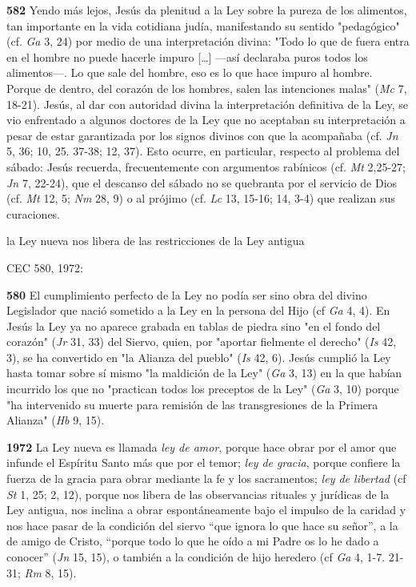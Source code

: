 \documentclass[]{article}
\begin{document}
\textbf{582} Yendo más lejos, Jesús da plenitud a la Ley sobre la pureza
de los alimentos, tan importante en la vida cotidiana judía,
manifestando su sentido "pedagógico" (cf. \emph{Ga} 3, 24) por medio de
una interpretación divina: "Todo lo que de fuera entra en el hombre no
puede hacerle impuro [\ldots{}] ---así declaraba puros todos los
alimentos---. Lo que sale del hombre, eso es lo que hace impuro al
hombre. Porque de dentro, del corazón de los hombres, salen las
intenciones malas" (\emph{Mc} 7, 18-21). Jesús, al dar con autoridad
divina la interpretación definitiva de la Ley, se vio enfrentado a
algunos doctores de la Ley que no aceptaban su interpretación a pesar de
estar garantizada por los signos divinos con que la acompañaba (cf.
\emph{Jn} 5, 36; 10, 25. 37-38; 12, 37). Esto ocurre, en particular,
respecto al problema del sábado: Jesús recuerda, frecuentemente con
argumentos rabínicos (cf. \emph{Mt} 2,25-27; \emph{Jn} 7, 22-24), que el
descanso del sábado no se quebranta por el servicio de Dios (cf.
\emph{Mt} 12, 5; \emph{Nm} 28, 9) o al prójimo (cf. \emph{Lc} 13, 15-16;
14, 3-4) que realizan sus curaciones.

la Ley nueva nos libera de las restricciones de la Ley antigua

CEC 580, 1972:

\textbf{580} El cumplimiento perfecto de la Ley no podía ser sino obra
del divino Legislador que nació sometido a la Ley en la persona del Hijo
(cf \emph{Ga} 4, 4). En Jesús la Ley ya no aparece grabada en tablas de
piedra sino "en el fondo del corazón" (\emph{Jr} 31, 33) del Siervo,
quien, por "aportar fielmente el derecho" (\emph{Is} 42, 3), se ha
convertido en "la Alianza del pueblo" (\emph{Is} 42, 6). Jesús cumplió
la Ley hasta tomar sobre sí mismo "la maldición de la Ley" (\emph{Ga} 3,
13) en la que habían incurrido los que no "practican todos los preceptos
de la Ley" (\emph{Ga} 3, 10) porque "ha intervenido su muerte para
remisión de las transgresiones de la Primera Alianza" (\emph{Hb} 9, 15).

\textbf{1972} La Ley nueva es llamada \emph{ley de amor}, porque hace
obrar por el amor que infunde el Espíritu Santo más que por el temor;
\emph{ley de gracia}, porque confiere la fuerza de la gracia para obrar
mediante la fe y los sacramentos; \emph{ley de libertad} (cf \emph{St}
1, 25; 2, 12), porque nos libera de las observancias rituales y
jurídicas de la Ley antigua, nos inclina a obrar espontáneamente bajo el
impulso de la caridad y nos hace pasar de la condición del siervo ``que
ignora lo que hace su señor'', a la de amigo de Cristo, ``porque todo lo
que he oído a mi Padre os lo he dado a conocer'' (\emph{Jn} 15, 15), o
también a la condición de hijo heredero (cf \emph{Ga} 4, 1-7. 21-31;
\emph{Rm} 8, 15).
\end{document}
